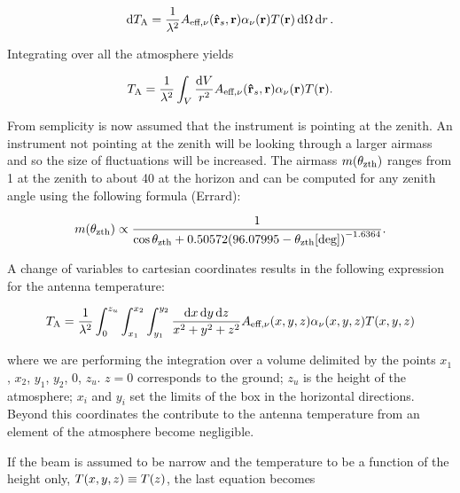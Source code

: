 \begin{equation}
        \dd{T_\text{A}} = \frac{1}{\lambda^2} A_{\text{eff},\nu}
        \qty(\vectorunit{r}_s,\vb{r}) \alpha_\nu\qty(\vb{r}) T\qty(\vb{r})
        \dd{\Omega}\dd{r}.
\end{equation}

Integrating over all the atmosphere yields

\begin{equation}
        T_\text{A} = \frac{1}{\lambda^2} \int_V \frac{\dd{V}}{r^2}
        A_{\text{eff},\nu} \qty(\vectorunit{r}_s,\vb{r})
        \alpha_\nu\qty(\vb{r}) T\qty(\vb{r}).
\end{equation}

From semplicity is now assumed that the instrument is pointing at the
zenith. An instrument not pointing at the zenith will be looking through a
larger airmass and so the size of fluctuations will be increased.
The airmass $m\qty(\theta_\text{zth})$ ranges from \num{1} at the zenith to
about \num{40} at the horizon and can be computed for any zenith angle
using the following formula (Errard):

\begin{equation}
        m\qty(\theta_\text{zth}) \propto
        \frac{1}{\cos \theta_\text{zth} + 0.50572
        \qty(96.07995 - \theta_\text{zth}[\text{deg}])^{-1.6364}}.
\end{equation}

A change of variables to cartesian coordinates results in the following
expression for the antenna temperature:

\begin{equation}
        T_\text{A} = \frac{1}{\lambda^2} \int^{z_u}_0 \int^{x_2}_{x_1}
        \int^{y_2}_{y_1} \frac{\dd{x}\dd{y}\dd{z}}{x^2 + y^2 + z^2}
        A_{\text{eff},\nu}\qty(x,y,z)
        \alpha_\nu\qty(x,y,z) T\qty(x,y,z)
\end{equation}

where we are performing the integration over a volume delimited by the
points $x_1$, $x_2$, $y_1$, $y_2$, 0, $z_u$. $z = 0$ corresponds to
the ground; $z_u$ is the height of the atmosphere; $x_i$ and $y_i$ set the
limits of the box in the horizontal directions. Beyond this coordinates the
contribute to the antenna temperature from an element of the atmosphere
become negligible.

If the beam is assumed to be narrow and the temperature to be a function
of the height only, $T\qty(x,y,z) \equiv T\qty(z)$, the last equation
becomes

